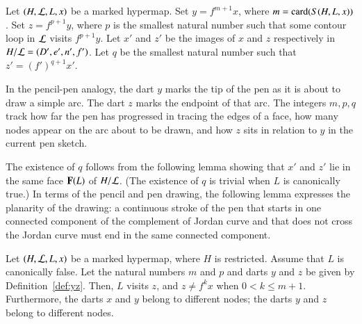 \figALMINNP %



\begin{definition}[$m$,~$p$,~$q$,~$y$,~$z$]\label{def:yz}
Let $(H,{\cal L},L,x)$ be a marked hypermap.
Set  $y = f^{m+1} x$, where $m = {\operatorname{card}}(S(H,L,x))$.
  Set
$z=f^{p+1} y$, where $p$ is the smallest natural number 
such that some contour loop in ${\cal L}$ visits $f^{p+1} y$.
Let $x'$ and $z'$ be the images of $x$ and $z$ respectively in $H/{\cal L} = (D',e',n',f')$.
Let $q$ be the smallest natural number such that $z' = (f')^{q+1} x'$.  
\end{definition}
%
%
%
%

In the pencil-pen analogy, the dart $y$ marks the tip of the pen as it
is about to draw a simple arc. The dart $z$ marks the endpoint of that
arc.  The integers $m,p,q$ track how far the pen has progressed in
tracing the edges of a face, how many nodes appear on the arc about to
be drawn, and how $z$ sits in relation to $y$ in the current pen
sketch.

The existence of $q$ follows from the following lemma showing that
$x'$ and $z'$ lie in the same face ${\mathbf F}(L)$ of $H/{\cal L}$.  (The
existence of $q$ is trivial when $L$ is canonically true.)  In terms
of the pencil and pen drawing, the following
lemma expresses the planarity of the drawing:
a continuous stroke of the pen that starts in one connected component of
the complement of Jordan curve and that does not cross the Jordan
curve must end in the same connected component.

\begin{lemma} \label{lemma:yz}
  Let $(H,{\cal L},L,x)$ be a marked hypermap, where $H$ is
  restricted.  Assume that $L$ is canonically
  false. %
  Let the natural numbers $m$ and $p$ and darts $y$ and $z$ be given
  by Definition~\ref{def:yz}.  Then, $L$ visits $z$, and $z\ne f^k x$
  when $0 < k \le {m+1}$.  Furthermore, the darts $x$ and $y$ belong
  to different nodes; the darts $y$ and $z$ belong to different nodes.
\end{lemma}

